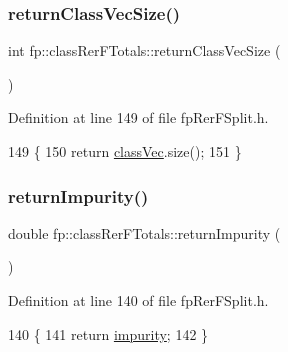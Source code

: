\subsubsection{\texorpdfstring{return\+Class\+Vec\+Size()}{returnClassVecSize()}}
{\footnotesize\ttfamily int fp\+::class\+Rer\+F\+Totals\+::return\+Class\+Vec\+Size (\begin{DoxyParamCaption}{ }\end{DoxyParamCaption})\hspace{0.3cm}{\ttfamily [inline]}}



Definition at line 149 of file fp\+Rer\+F\+Split.\+h.


\begin{DoxyCode}
149                                            \{
150                 \textcolor{keywordflow}{return} \hyperlink{classfp_1_1classRerFTotals_a4a7b583fc52d7631771f5dd04d20a68a}{classVec}.size();
151             \}
\end{DoxyCode}
\mbox{\label{classfp_1_1classRerFTotals_afb6ce5c3e6de1bbf33d1ebe225bcecac}} 
\subsubsection{\texorpdfstring{return\+Impurity()}{returnImpurity()}}
{\footnotesize\ttfamily double fp\+::class\+Rer\+F\+Totals\+::return\+Impurity (\begin{DoxyParamCaption}{ }\end{DoxyParamCaption})\hspace{0.3cm}{\ttfamily [inline]}}



Definition at line 140 of file fp\+Rer\+F\+Split.\+h.


\begin{DoxyCode}
140                                    \{
141                 \textcolor{keywordflow}{return} \hyperlink{classfp_1_1classRerFTotals_a8dfed045129bbae0420ff4094c137b1a}{impurity};
142             \}
\end{DoxyCode}
\mbox{\label{classfp_1_1classRerFTotals_a4d88f6b7bdaabd6dc03f443bdc5f5de0}} 
